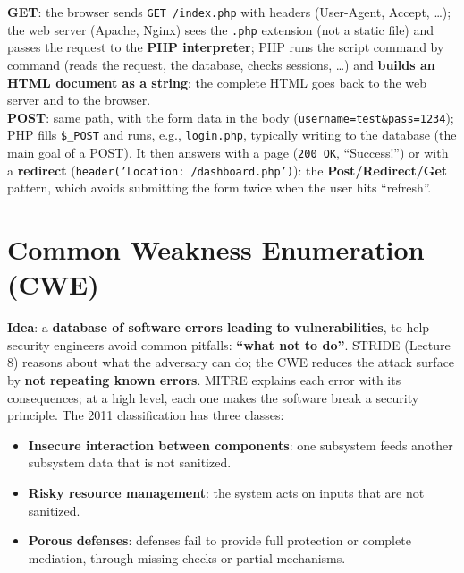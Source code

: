 \begin{defnbox}[title={Lifetime of a request on a PHP server}]
\textbf{GET}: the browser sends \texttt{GET /index.php} with headers (User-Agent, Accept, \ldots);
the web server (Apache, Nginx) sees the \texttt{.php} extension (not a static file) and passes the
request to the \textbf{PHP interpreter}; PHP runs the script command by command (reads the request,
the database, checks sessions, \ldots) and \textbf{builds an HTML document as a string}; the
complete HTML goes back to the web server and to the browser. \\
\textbf{POST}: same path, with the form data in the body (\texttt{username=test\&pass=1234}); PHP
fills \texttt{\$\_POST} and runs, e.g., \texttt{login.php}, typically writing to the database (the
main goal of a POST). It then answers with a page (\texttt{200 OK}, ``Success!'') or with a
\textbf{redirect} (\texttt{header('Location: /dashboard.php')}): the
\textbf{Post/Redirect/Get} pattern, which avoids submitting the form twice when the user hits
``refresh''.
\end{defnbox}

\section{Common Weakness Enumeration (CWE)}

\begin{defnbox}[title={Common Weakness Enumeration}]
\textbf{Idea}: a \textbf{database of software errors leading to vulnerabilities}, to help security
engineers avoid common pitfalls: \textbf{``what not to do''}. STRIDE (Lecture 8) reasons about what
the adversary can do; the CWE reduces the attack surface by \textbf{not repeating known errors}.
MITRE explains each error with its consequences; at a high level, each one makes the software
break a security principle. The 2011 classification has three classes:
\begin{itemize}
  \item \textbf{Insecure interaction between components}: one subsystem feeds another subsystem
        data that is not sanitized.
  \item \textbf{Risky resource management}: the system acts on inputs that are not sanitized.
  \item \textbf{Porous defenses}: defenses fail to provide full protection or complete mediation,
        through missing checks or partial mechanisms.
\end{itemize}
\end{defnbox}

